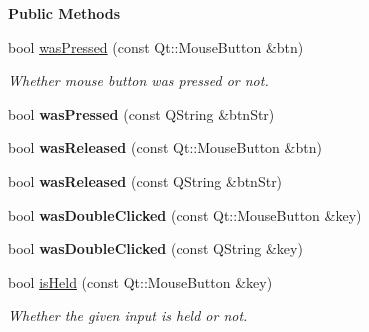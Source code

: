 \begin{Indent}\textbf{ Public Methods}\par
\begin{DoxyCompactItemize}
\item 
\mbox{\label{classrev_1_1_mouse_handler_a10dc4366919589a4fac6acad9ab8402c}} 
bool \mbox{\hyperlink{classrev_1_1_mouse_handler_a10dc4366919589a4fac6acad9ab8402c}{was\+Pressed}} (const Qt\+::\+Mouse\+Button \&btn)
\begin{DoxyCompactList}\small\item\em Whether mouse button was pressed or not. \end{DoxyCompactList}\item 
\mbox{\label{classrev_1_1_mouse_handler_af118b806a286c3c9c7f671a55727d0e8}} 
bool {\bfseries was\+Pressed} (const Q\+String \&btn\+Str)
\item 
\mbox{\label{classrev_1_1_mouse_handler_a4cfa89ee4c803631fc397917d7ba1c3b}} 
bool {\bfseries was\+Released} (const Qt\+::\+Mouse\+Button \&btn)
\item 
\mbox{\label{classrev_1_1_mouse_handler_a26bc263173ba3fb46ed0769384759b99}} 
bool {\bfseries was\+Released} (const Q\+String \&btn\+Str)
\item 
\mbox{\label{classrev_1_1_mouse_handler_af37828fd8593fd667222afe58ec21452}} 
bool {\bfseries was\+Double\+Clicked} (const Qt\+::\+Mouse\+Button \&key)
\item 
\mbox{\label{classrev_1_1_mouse_handler_a4fde21de5c35dddb5fe7354dd3288847}} 
bool {\bfseries was\+Double\+Clicked} (const Q\+String \&key)
\item 
\mbox{\label{classrev_1_1_mouse_handler_ac73bb67d6d6dd1925cfd9b6631c173a7}} 
bool \mbox{\hyperlink{classrev_1_1_mouse_handler_ac73bb67d6d6dd1925cfd9b6631c173a7}{is\+Held}} (const Qt\+::\+Mouse\+Button \&key)
\begin{DoxyCompactList}\small\item\em Whether the given input is held or not. \end{DoxyCompactList}\item 

\end{DoxyCompactItemize}
\end{Indent}
